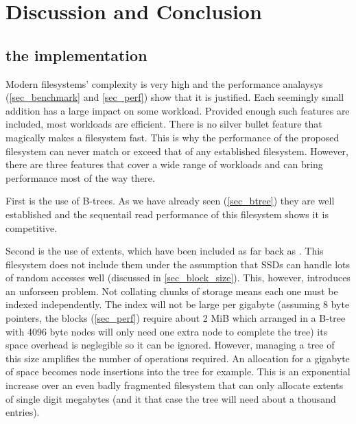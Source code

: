 \chapter{Discussion and Conclusion}

    \section{the implementation}

        Modern filesystems' complexity is very high and the performance
        analaysys (\ref{sec_benchmark} and \ref{sec_perf}) show that it is
        justified. Each seemingly small addition has a large impact on some
        workload. Provided enough such features are included, most workloads
        are efficient. There is no silver bullet feature that magically makes a
        filesystem fast. This is why the performance of the proposed filesystem
        can never match or exceed that of any established filesystem. However,
        there are three features that cover a wide range of workloads and can
        bring performance most of the way there.

        First is the use of B-trees. As we have already seen (\ref{sec_btree})
        they are well established and the sequentail read performance of this
        filesystem shows it is competitive.

        Second is the use of extents, which have been included as far back as
        \citeyear{LFS}. This filesystem does not include them under the
        assumption that SSDs can handle lots of random accesses well (discussed
        in \ref{sec_block_size}). This, however, introduces an unforseen
        problem. Not collating chunks of storage means each one must be indexed
        independently. The index will not be large per gigabyte (assuming 8
        byte pointers, the  blocks (\ref{sec_perf}) require
        about 2 MiB which arranged in a B-tree with 4096 byte nodes will only
        need one extra node to complete the tree) its space overhead is
        neglegible so it can be ignored. However, managing a tree of this size
        amplifies the number of operations required. An allocation for a
        gigabyte of space becomes  node insertions into the
        tree for example. This is an exponential increase over an even badly
        fragmented filesystem that can only allocate extents of single digit
        megabytes (and it that case the tree will need about a thousand
        entries).

